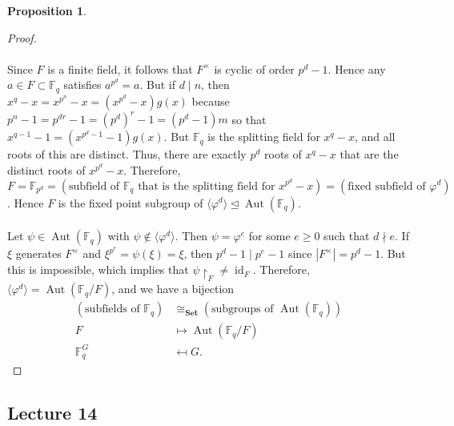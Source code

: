 \documentclass[10pt,letterpaper,cm]{nupset}
\theoremstyle{definition}
\newtheorem{prop}{Proposition}
\newcommand{\F}{\mathbb F}
\newcommand{\1}{\mathbf{1}}
\newcommand{\0}{\vec 0}
\DeclareMathOperator{\id}{id}
\DeclareMathOperator{\aut}{Aut}
\begin{document}
\begin{prop}
\begin{enumerate}
\begin{proof}
\\ \\ Since $F$ is a finite field, it follows that $F^{\times}$ is cyclic of order $p^d -1$. Hence any $a\in F\subset \F_q$ satisfies $a^{p^d} =a$. But if $ d\mid n$, then $x^q -x = x^{p^n} -x = (x^{p^d} -x)g(x)$ because $p^n -1 = p^{dr}-1 = (p^d)^r -1 = (p^d -1)m$ so that $x^{q-1}-1 = (x^{p^d -1} -1) g(x)$. But $\F_q$ is the splitting field for $x^q-x$, and all roots of this are distinct. Thus, there are exactly $p^d$ roots of $x^q-x$ that are the distinct roots of $x^{p^d}-x$. Therefore, $F = \F_{p^d} = (\text{subfield of } \F_q \text{ that is the splitting field for } x^{p^d} -x)= (\text{fixed subfield of } \varphi^d)$ . Hence $F$ is the fixed point subgroup of $\langle \varphi^d\rangle \unlhd \aut(\F_q)$.
\\ \\	Let $\psi \in \aut(\F_q)$ with $\psi \notin \langle \varphi^d \rangle$. Then $\psi =\varphi^e$ for some $e\geq 0$ such that $d \nmid e$. If $\xi$ generates $F^{\times}$ and $\xi^{p^e} =\psi(\xi) = \xi$, then $p^d -1 \mid p^e-1$ since $|F^{\times}|=p^d-1$. But this is impossible, which implies that $\psi\restriction_F \ne \id_F$. Therefore, $\langle \varphi^d \rangle =\aut(\F_q/F)$, and we have a bijection 
\begin{align*}
(\text{subfields of } \F_q) & \cong_{\mathbf{Set}} (\text{subgroups of } \aut(\F_q))
\\ F & \mapsto \aut(\F_q/F)
\\  \F_q^G & \mapsfrom G.
\end{align*}
\end{proof}
\end{enumerate}
\end{prop} 

\subsection{Lecture 14}
\end{document}
